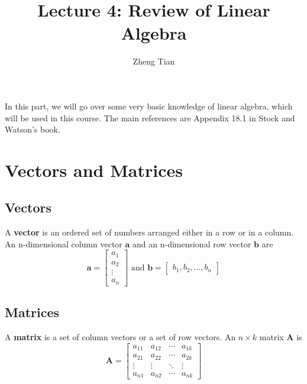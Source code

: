 \documentclass[a4paper,11pt]{article}
\author{Zheng Tian}
\date{}
\title{Lecture 4: Review of Linear Algebra}
\begin{document}
\maketitle
\setcounter{tocdepth}{2}
\tableofcontents

In this part, we will go over some very basic knowledge of linear algebra, which
will be used in this course. The main references are Appendix 18.1 in
Stock and Watson's book. 

\section{Vectors and Matrices}
\label{sec:orgb246dbc}

\subsection{Vectors}
\label{sec:orgb879950}

A \textbf{vector} is an ordered set of numbers arranged either in a row or in
a column. An n-dimensional column vector \(\mathbf{a}\) and an n-dimensional
row vector \(\mathbf{b}\) are
\begin{equation*}
 \mathbf{a} = 
 \begin{bmatrix}
 a_1 \\ a_2 \\ \vdots \\ a_n
 \end{bmatrix}
\text{ and }
 \mathbf{b} = 
 \begin{bmatrix}
 b_1, b_2, \ldots, b_n
 \end{bmatrix}
\end{equation*}


\subsection{Matrices}
\label{sec:org828ecad}

A \textbf{matrix} is a set of column vectors or a set of row vectors. An
\(n \times k\) matrix \(\mathbf{A}\) is
\begin{equation*}
\mathbf{A} = 
\begin{bmatrix}
a_{11} & a_{12} & \cdots & a_{1k} \\
a_{21} & a_{22} & \cdots & a_{2k} \\
\vdots & \vdots & \ddots & \vdots \\
a_{n1} & a_{n2} & \cdots & a_{nk}
\end{bmatrix}
\end{equation*} 
\end{document}
